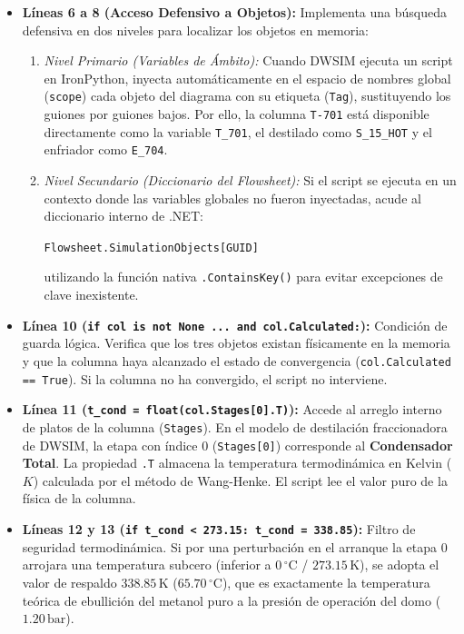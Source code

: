 \documentclass[11pt,a4paper]{article}
\begin{document}
\begin{itemize}
    \item \textbf{Líneas 6 a 8 (Acceso Defensivo a Objetos):}
    Implementa una búsqueda defensiva en dos niveles para localizar los objetos en memoria:
    \begin{enumerate}
        \item \textit{Nivel Primario (Variables de Ámbito):} Cuando DWSIM ejecuta un script en IronPython, inyecta automáticamente en el espacio de nombres global (\texttt{scope}) cada objeto del diagrama con su etiqueta (\texttt{Tag}), sustituyendo los guiones por guiones bajos. Por ello, la columna \texttt{T-701} está disponible directamente como la variable \texttt{T\_701}, el destilado como \texttt{S\_15\_HOT} y el enfriador como \texttt{E\_704}.
        \item \textit{Nivel Secundario (Diccionario del Flowsheet):} Si el script se ejecuta en un contexto donde las variables globales no fueron inyectadas, acude al diccionario interno de .NET:
        \begin{center}
        \texttt{Flowsheet.SimulationObjects[GUID]}
        \end{center}
        utilizando la función nativa \texttt{.ContainsKey()} para evitar excepciones de clave inexistente.
    \end{enumerate}

    \item \textbf{Línea 10 (\texttt{if col is not None ... and col.Calculated:}):}
    Condición de guarda lógica. Verifica que los tres objetos existan físicamente en la memoria y que la columna haya alcanzado el estado de convergencia (\texttt{col.Calculated == True}). Si la columna no ha convergido, el script no interviene.

    \item \textbf{Línea 11 (\texttt{t\_cond = float(col.Stages[0].T)}):}
    Accede al arreglo interno de platos de la columna (\texttt{Stages}). En el modelo de destilación fraccionadora de DWSIM, la etapa con índice 0 (\texttt{Stages[0]}) corresponde al \textbf{Condensador Total}. La propiedad \texttt{.T} almacena la temperatura termodinámica en Kelvin ($K$) calculada por el método de Wang-Henke. El script lee el valor puro de la física de la columna.

    \item \textbf{Líneas 12 y 13 (\texttt{if t\_cond < 273.15: t\_cond = 338.85}):}
    Filtro de seguridad termodinámica. Si por una perturbación en el arranque la etapa 0 arrojara una temperatura subcero (inferior a $0\,^\circ\text{C}$ / $273.15\,\text{K}$), se adopta el valor de respaldo $338.85\,\text{K}$ ($65.70\,^\circ\text{C}$), que es exactamente la temperatura teórica de ebullición del metanol puro a la presión de operación del domo ($1.20\,\text{bar}$).


\end{itemize}
\end{document}
